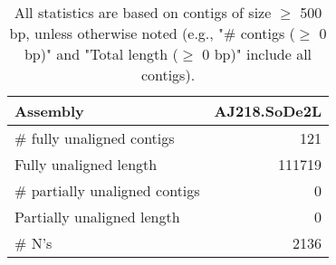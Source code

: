 \documentclass[12pt,a4paper]{article}
\begin{document}
\begin{table}[ht]
\begin{center}
\caption{All statistics are based on contigs of size $\geq$ 500 bp, unless otherwise noted (e.g., "\# contigs ($\geq$ 0 bp)" and "Total length ($\geq$ 0 bp)" include all contigs).}
\begin{tabular}{|l*{1}{|r}|}
\hline
Assembly & AJ218.SoDe2L \\ \hline
\# fully unaligned contigs & 121 \\ \hline
Fully unaligned length & 111719 \\ \hline
\# partially unaligned contigs & 0 \\ \hline
Partially unaligned length & 0 \\ \hline
\# N's & 2136 \\ \hline
\end{tabular}
\end{center}
\end{table}
\end{document}
